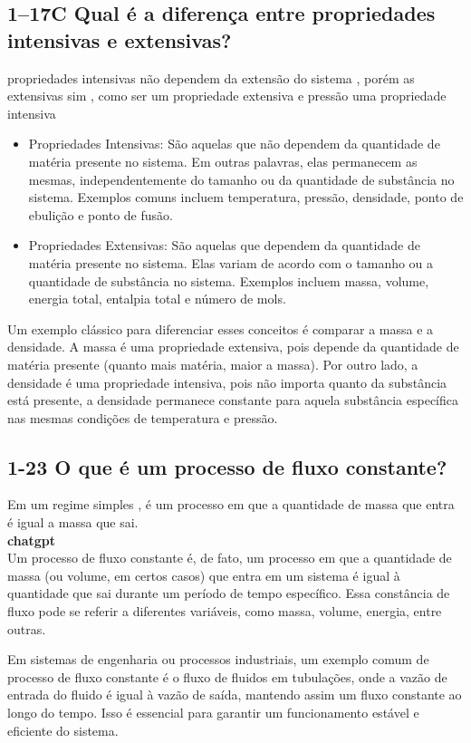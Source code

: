 \documentclass{article}
\begin{document}
\subsection*{1–17C Qual é a diferença entre propriedades intensivas e extensivas?}
propriedades intensivas não dependem da extensão do sistema , porém as extensivas sim , como ser um propriedade extensiva e pressão uma propriedade intensiva
\begin{itemize}
    \item Propriedades Intensivas: São aquelas que não dependem da quantidade de matéria presente no sistema. Em outras palavras, elas permanecem as mesmas, independentemente do tamanho ou da quantidade de substância no sistema. Exemplos comuns incluem temperatura, pressão, densidade, ponto de ebulição e ponto de fusão.

    \item Propriedades Extensivas: São aquelas que dependem da quantidade de matéria presente no sistema. Elas variam de acordo com o tamanho ou a quantidade de substância no sistema. Exemplos incluem massa, volume, energia total, entalpia total e número de mols.
    
    
\end{itemize}
Um exemplo clássico para diferenciar esses conceitos é comparar a massa e a densidade. A massa é uma propriedade extensiva, pois depende da quantidade de matéria presente (quanto mais matéria, maior a massa). Por outro lado, a densidade é uma propriedade intensiva, pois não importa quanto da substância está presente, a densidade permanece constante para aquela substância específica nas mesmas condições de temperatura e pressão.
\subsection*{1-23 O que é um processo de fluxo constante?}Em um regime simples , é um processo em que a quantidade de massa que entra é igual a massa que sai.\\
\textbf{chatgpt}\\
Um processo de fluxo constante é, de fato, um processo em que a quantidade de massa (ou volume, em certos casos) que entra em um sistema é igual à quantidade que sai durante um período de tempo específico. Essa constância de fluxo pode se referir a diferentes variáveis, como massa, volume, energia, entre outras.

Em sistemas de engenharia ou processos industriais, um exemplo comum de processo de fluxo constante é o fluxo de fluidos em tubulações, onde a vazão de entrada do fluido é igual à vazão de saída, mantendo assim um fluxo constante ao longo do tempo. Isso é essencial para garantir um funcionamento estável e eficiente do sistema.
\end{document}
